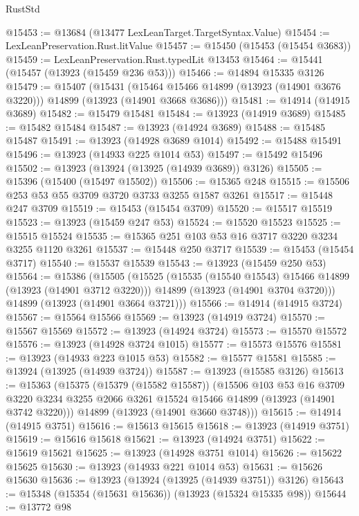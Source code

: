 \begin{lexlean}{RustStd}
\begin{coremodule}
@15453 := @13684 (@13477 LexLeanTarget.TargetSyntax.Value)
@15454 := LexLeanPreservation.Rust.litValue
@15457 := @15450 (@15453 (@15454 @3683))
@15459 := LexLeanPreservation.Rust.typedLit @13453
@15464 := @15441 (@15457 (@13923 (@15459 @236 @53)))
@15466 := @14894 @15335 @3126
@15479 := @15407
    (@15431
      (@15464 @15466 @14899 (@13923 (@14901 @3676 @3220)))
      @14899
      (@13923 (@14901 @3668 @3686)))
@15481 := @14914 (@14915 @3689)
@15482 := @15479 @15481
@15484 := @13923 (@14919 @3689)
@15485 := @15482 @15484
@15487 := @13923 (@14924 @3689)
@15488 := @15485 @15487
@15491 := @13923 (@14928 @3689 @1014)
@15492 := @15488 @15491
@15496 := @13923 (@14933 @225 @1014 @53)
@15497 := @15492 @15496
@15502 := @13923 (@13924 (@13925 (@14939 @3689)) @3126)
@15505 := @15396 (@15400 (@15497 @15502))
@15506 := @15365 @248
@15515 := @15506 @253 @53 @55 @3709 @3720 @3733 @3255 @1587 @3261
@15517 := @15448 @247 @3709
@15519 := @15453 (@15454 @3709)
@15520 := @15517 @15519
@15523 := @13923 (@15459 @247 @53)
@15524 := @15520 @15523
@15525 := @15515 @15524
@15535 := @15365 @251 @103 @53 @16 @3717 @3220 @3234 @3255 @1120 @3261
@15537 := @15448 @250 @3717
@15539 := @15453 (@15454 @3717)
@15540 := @15537 @15539
@15543 := @13923 (@15459 @250 @53)
@15564 := @15386
    (@15505
      (@15525
        (@15535 (@15540 @15543) @15466 @14899 (@13923 (@14901 @3712 @3220)))
        @14899
        (@13923 (@14901 @3704 @3720)))
      @14899
      (@13923 (@14901 @3664 @3721)))
@15566 := @14914 (@14915 @3724)
@15567 := @15564 @15566
@15569 := @13923 (@14919 @3724)
@15570 := @15567 @15569
@15572 := @13923 (@14924 @3724)
@15573 := @15570 @15572
@15576 := @13923 (@14928 @3724 @1015)
@15577 := @15573 @15576
@15581 := @13923 (@14933 @223 @1015 @53)
@15582 := @15577 @15581
@15585 := @13924 (@13925 (@14939 @3724))
@15587 := @13923 (@15585 @3126)
@15613 := @15363
    (@15375
      (@15379 (@15582 @15587))
      (@15506
        @103
        @53
        @16
        @3709
        @3220
        @3234
        @3255
        @2066
        @3261
        @15524
        @15466
        @14899
        (@13923 (@14901 @3742 @3220)))
      @14899
      (@13923 (@14901 @3660 @3748)))
@15615 := @14914 (@14915 @3751)
@15616 := @15613 @15615
@15618 := @13923 (@14919 @3751)
@15619 := @15616 @15618
@15621 := @13923 (@14924 @3751)
@15622 := @15619 @15621
@15625 := @13923 (@14928 @3751 @1014)
@15626 := @15622 @15625
@15630 := @13923 (@14933 @221 @1014 @53)
@15631 := @15626 @15630
@15636 := @13923 (@13924 (@13925 (@14939 @3751)) @3126)
@15643 := @15348 (@15354 (@15631 @15636)) (@13923 (@15324 @15335 @98))
@15644 := @13772 @98

\end{coremodule}
\end{lexlean}
